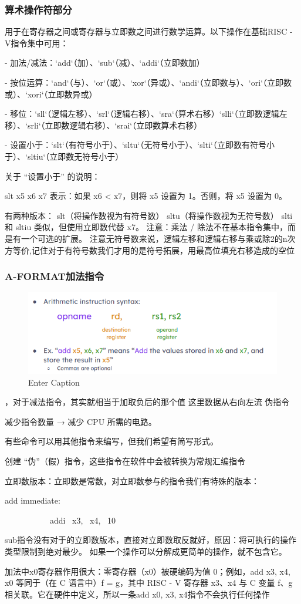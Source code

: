 \documentclass{ctexart}
\begin{document}
\subsubsection{算术操作符部分}




用于在寄存器之间或寄存器与立即数之间进行数学运算。以下操作在基础RISC - V指令集中可用：  \par
- 加法/减法：`add`（加）、`sub`（减）、`addi`（立即数加）\par  
- 按位运算：`and`（与）、`or`（或）、`xor`（异或）、`andi`（立即数与）、`ori`（立即数或）、`xori`（立即数异或）  \par
- 移位：`sll`（逻辑左移）、`srl`（逻辑右移）、`sra`（算术右移）\、`slli`（立即数逻辑左移）、`srli`（立即数逻辑右移）、`srai`（立即数算术右移）  \par
- 设置小于：`slt`（有符号小于）、`sltu`（无符号小于）、`slti`（立即数有符号小于）、`sltiu`（立即数无符号小于） \par
关于 “设置小于” 的说明：\par
slt x5 x6 x7 表示：如果 x6 < x7，则将 x5 设置为 1。否则，将 x5 设置为 0。\par
有两种版本：
slt（将操作数视为有符号数）
sltu（将操作数视为无符号数）
slti 和 sltiu 类似，但使用立即数代替 x7。
注意：乘法 / 除法不在基本指令集中，而是有一个可选的扩展。
注意无符号数来说，逻辑左移和逻辑右移与乘或除2的n次方等价,记住对于有符号数我们才用的是符号拓展，用最高位填充右移造成的空位\par
\subsubsection{A-FORMAT加法指令}
\begin{figure}
    \centering
    \includegraphics[width=0.25\linewidth]{加法指令格式.png}
    \caption{Enter Caption}
    \label{fig:enter-label}
\end{figure}，对于减法指令，其实就相当于加取负后的那个值
这里数据从右向左流
伪指令\par
减少指令数量 → 减少 CPU 所需的电路。\par
有些命令可以用其他指令来编写，但我们希望有简写形式。\par
创建 “伪”（假）指令，这些指令在软件中会被转换为常规汇编指令\par
立即数版本：立即数是常数，对立即数参与的指令我们有特殊的版本：\par
add immediate:\par
\ \ \ \ \ \ \ \ \ \ \ addi \ x3, \ x4, \ 10\par
sub指令没有对于的立即数版本，直接对立即数取反就好，原因：将可执行的操作类型限制到绝对最少。
如果一个操作可以分解成更简单的操作，就不包含它。\par
加法中x0寄存器作用很大：零寄存器（x0）被硬编码为值 0；例如，add x3, x4, x0 等同于（在 C 语言中）f = g，其中 RISC - V 寄存器 x3、x4 与 C 变量 f、g 相关联。它在硬件中定义，所以一条add x0, x3, x4指令不会执行任何操作\par
\end{document}

